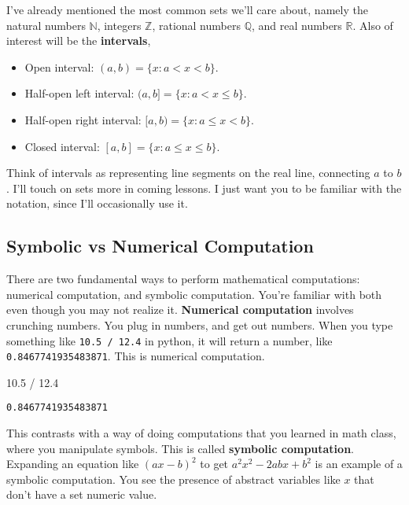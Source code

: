 \documentclass[
  letterpaper,
  DIV=11,
  numbers=noendperiod]{scrreprt}
\newenvironment{Shaded}{\begin{snugshade}}{\end{snugshade}}
\newcommand{\FloatTok}[1]{\textcolor[rgb]{0.68,0.00,0.00}{#1}}
\newcommand{\OperatorTok}[1]{\textcolor[rgb]{0.37,0.37,0.37}{#1}}
\providecommand{\tightlist}{%
  \setlength{\itemsep}{0pt}\setlength{\parskip}{0pt}}\usepackage{longtable,booktabs,array}
\begin{document}
I've already mentioned the most common sets we'll care about, namely the
natural numbers \(\mathbb{N}\), integers \(\mathbb{Z}\), rational
numbers \(\mathbb{Q}\), and real numbers \(\mathbb{R}\). Also of
interest will be the \textbf{intervals},

\begin{itemize}
\tightlist
\item
  Open interval: \((a, b) = \{x: a < x < b \}\).
\item
  Half-open left interval: \((a, b] = \{x: a < x \leq b \}\).
\item
  Half-open right interval: \([a, b) = \{x: a \leq x < b \}\).
\item
  Closed interval: \([a, b] = \{x: a \leq x \leq b \}\).
\end{itemize}

Think of intervals as representing line segments on the real line,
connecting \(a\) to \(b\). I'll touch on sets more in coming lessons. I
just want you to be familiar with the notation, since I'll occasionally
use it.

\hypertarget{symbolic-vs-numerical-computation}{%
\subsection{Symbolic vs Numerical
Computation}\label{symbolic-vs-numerical-computation}}

There are two fundamental ways to perform mathematical computations:
numerical computation, and symbolic computation. You're familiar with
both even though you may not realize it. \textbf{Numerical computation}
involves crunching numbers. You plug in numbers, and get out numbers.
When you type something like \texttt{10.5\ /\ 12.4} in python, it will
return a number, like \texttt{0.8467741935483871}. This is numerical
computation.

\begin{Shaded}
\begin{Highlighting}[]
\FloatTok{10.5} \OperatorTok{/} \FloatTok{12.4}
\end{Highlighting}
\end{Shaded}

\begin{verbatim}
0.8467741935483871
\end{verbatim}

This contrasts with a way of doing computations that you learned in math
class, where you manipulate symbols. This is called \textbf{symbolic
computation}. Expanding an equation like \((ax-b)^2\) to get
\(a^2x^2 - 2abx + b^2\) is an example of a symbolic computation. You see
the presence of abstract variables like \(x\) that don't have a set
numeric value.
\end{document}
